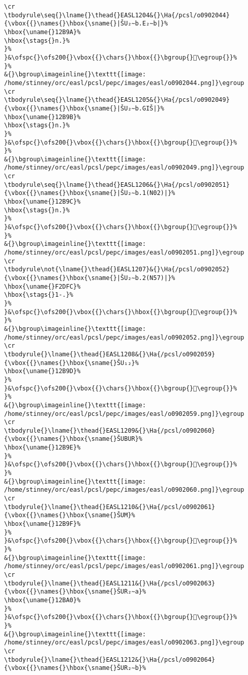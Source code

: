\begin{verbatim}
\cr
\tbodyrule\seq{}\lname{}\thead{}EASL1204&{}\Ha{/pcsl/o0902044}{\vbox{{}\names{}\hbox{\sname{}|ŠU₂∼b.E₂∼b|}%
\hbox{\uname{}12B9A}%
\hbox{\stags{}n.}%
}%
}&\ofspc{}\ofs200{}\vbox{{}\chars{}\hbox{{}\bgroup{}𒮚\egroup{}}%
}%
&{}\bgroup\imageinline{}\texttt{[image: /home/stinney/orc/easl/pcsl/pepc/images/easl/o0902044.png]}\egroup
\cr
\tbodyrule\seq{}\lname{}\thead{}EASL1205&{}\Ha{/pcsl/o0902049}{\vbox{{}\names{}\hbox{\sname{}|ŠU₂∼b.GIŠ|}%
\hbox{\uname{}12B9B}%
\hbox{\stags{}n.}%
}%
}&\ofspc{}\ofs200{}\vbox{{}\chars{}\hbox{{}\bgroup{}𒮛\egroup{}}%
}%
&{}\bgroup\imageinline{}\texttt{[image: /home/stinney/orc/easl/pcsl/pepc/images/easl/o0902049.png]}\egroup
\cr
\tbodyrule\seq{}\lname{}\thead{}EASL1206&{}\Ha{/pcsl/o0902051}{\vbox{{}\names{}\hbox{\sname{}|ŠU₂∼b.1(N02)|}%
\hbox{\uname{}12B9C}%
\hbox{\stags{}n.}%
}%
}&\ofspc{}\ofs200{}\vbox{{}\chars{}\hbox{{}\bgroup{}𒮜\egroup{}}%
}%
&{}\bgroup\imageinline{}\texttt{[image: /home/stinney/orc/easl/pcsl/pepc/images/easl/o0902051.png]}\egroup
\cr
\tbodyrule\not{\lname{}\thead{}EASL1207}&{}\Ha{/pcsl/o0902052}{\vbox{{}\names{}\hbox{\sname{}|ŠU₂∼b.2(N57)|}%
\hbox{\uname{}F2DFC}%
\hbox{\stags{}1-.}%
}%
}&\ofspc{}\ofs200{}\vbox{{}\chars{}\hbox{{}\bgroup{}󲷼\egroup{}}%
}%
&{}\bgroup\imageinline{}\texttt{[image: /home/stinney/orc/easl/pcsl/pepc/images/easl/o0902052.png]}\egroup
\cr
\tbodyrule{}\lname{}\thead{}EASL1208&{}\Ha{/pcsl/o0902059}{\vbox{{}\names{}\hbox{\sname{}ŠU₁₂}%
\hbox{\uname{}12B9D}%
}%
}&\ofspc{}\ofs200{}\vbox{{}\chars{}\hbox{{}\bgroup{}𒮝\egroup{}}%
}%
&{}\bgroup\imageinline{}\texttt{[image: /home/stinney/orc/easl/pcsl/pepc/images/easl/o0902059.png]}\egroup
\cr
\tbodyrule{}\lname{}\thead{}EASL1209&{}\Ha{/pcsl/o0902060}{\vbox{{}\names{}\hbox{\sname{}ŠUBUR}%
\hbox{\uname{}12B9E}%
}%
}&\ofspc{}\ofs200{}\vbox{{}\chars{}\hbox{{}\bgroup{}𒮞\egroup{}}%
}%
&{}\bgroup\imageinline{}\texttt{[image: /home/stinney/orc/easl/pcsl/pepc/images/easl/o0902060.png]}\egroup
\cr
\tbodyrule{}\lname{}\thead{}EASL1210&{}\Ha{/pcsl/o0902061}{\vbox{{}\names{}\hbox{\sname{}ŠUM}%
\hbox{\uname{}12B9F}%
}%
}&\ofspc{}\ofs200{}\vbox{{}\chars{}\hbox{{}\bgroup{}𒮟\egroup{}}%
}%
&{}\bgroup\imageinline{}\texttt{[image: /home/stinney/orc/easl/pcsl/pepc/images/easl/o0902061.png]}\egroup
\cr
\tbodyrule{}\lname{}\thead{}EASL1211&{}\Ha{/pcsl/o0902063}{\vbox{{}\names{}\hbox{\sname{}ŠUR₂∼a}%
\hbox{\uname{}12BA0}%
}%
}&\ofspc{}\ofs200{}\vbox{{}\chars{}\hbox{{}\bgroup{}𒮠\egroup{}}%
}%
&{}\bgroup\imageinline{}\texttt{[image: /home/stinney/orc/easl/pcsl/pepc/images/easl/o0902063.png]}\egroup
\cr
\tbodyrule{}\lname{}\thead{}EASL1212&{}\Ha{/pcsl/o0902064}{\vbox{{}\names{}\hbox{\sname{}ŠUR₂∼b}%

\end{verbatim}
